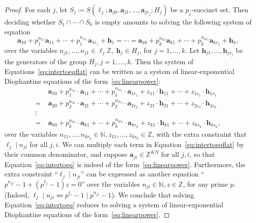 \documentclass[letterpaper, 11pt, thm-restate]{article}
\numberwithin{equation}{section}
\newcommand{\Z}{\mathbb{Z}}
\newcommand{\N}{\mathbb{N}}
\newcommand{\ba}{\boldsymbol{a}}
\newcommand{\bh}{\boldsymbol{h}}
\theoremstyle{definition}
\theoremstyle{definition}
\theoremstyle{definition}
\begin{document}
\begin{proof}
    For each $j$, let $S_j \coloneqq S(\ell_j; \ba_{j0}, \ba_{j1}, \ldots, \ba_{jr_j}; H_j)$ be a $p_j$-succinct set.
    Then deciding whether $S_1 \cap \cdots \cap S_k$ is empty amounts to solving the following system of equation
    \begin{equation}\label{eq:intertoeqflat}
    \ba_{10} + p_1^{n_{11}} \ba_{11} + \cdots + p_1^{n_{1r_1}} \ba_{1r_1} + \bh_1 = \cdots = \ba_{k0} + p_k^{n_{k1}} \ba_{k1} + \cdots + p_k^{n_{kr_k}} \ba_{kr_k} + \bh_k,
    \end{equation}
    over the variables $n_{j1}, \ldots, n_{j1} \in \ell_j \Z, \; \bh_j \in H_j$, for $j = 1, \ldots, k$.
    Let $\bh_{j1}, \ldots, \bh_{js_j}$ be the generators of the group $H_j, j = 1, \ldots, k$.
    Then the system of Equations~\eqref{eq:intertoeqflat} can be written as a system of linear-exponential Diophantine equations of the form~\eqref{eq:linearpower}:
    \begin{align}\label{eq:intertoeq}
    & \; \ba_{10} + p_1^{n_{11}} \cdot \ba_{11} + \cdots + p_1^{n_{1r_1}} \cdot \ba_{1r_1} + z_{11} \cdot \bh_{11} + \cdots + z_{1s_1} \cdot \bh_{1s_1} \nonumber\\
    = & \; \ba_{20} + p_2^{n_{21}} \cdot \ba_{21} + \cdots + p_2^{n_{2r_2}} \cdot \ba_{2r_2} + z_{21} \cdot \bh_{21} + \cdots + z_{2s_2} \cdot \bh_{2s_2} \nonumber\\
    \vdots & \nonumber\\
    = & \; \ba_{k0} + p_k^{n_{k1}} \cdot \ba_{k1} + \cdots + p_k^{n_{kr_k}} \cdot \ba_{kr_k} + z_{k1} \cdot \bh_{k1} + \cdots + z_{ks_k} \cdot \bh_{ks_k},
    \end{align}
    over the variables $n_{11}, \ldots, n_{kr_k} \in \N, z_{11}, \ldots, z_{k s_k} \in \Z$, with the extra constraint that $\ell_j \mid n_{ji}$ for all $j, i$.
    We can multiply each term in Equation~\eqref{eq:intertoeqflat} by their common denominator, and suppose $\ba_{ji} \in \Z^{KN}$ for all $j, i$, so that Equation~\eqref{eq:intertoeq} is indeed of the form~\eqref{eq:linearpower}.
    Furthermore, the extra constraint ``$\ell_j \mid n_{ji}$'' can be expressed as another equation
    ``$
    p^{n_{ji}} - 1 + (p^{\ell_j} - 1) z = 0
    $''
    over the variables $n_{ji} \in \N, z \in \Z$, for any prime $p$. (Indeed, $\ell_j \mid n_{ji} \iff p^{\ell_i} - 1 \mid p^{n_{ji}} - 1$).
    We conclude that solving Equation~\eqref{eq:intertoeq} reduces to solving a system of linear-exponential Diophantine equations of the form~\eqref{eq:linearpower}.
\end{proof}
\end{document}
